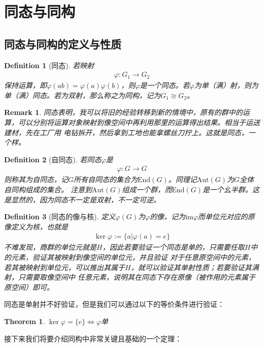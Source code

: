\documentclass[12pt,a4paper,UTF8]{ctexbook}
\theoremstyle{plain}
\newtheorem{theorem}{\indent Theorem}[section]
\newtheorem{definition}{\indent Definition}[section]
\newtheorem{remark}{\indent Remark}[section]
\begin{document}
\section{同态与同构}
\subsection{同态与同构的定义与性质}
\begin{definition}[同态]
    若映射
    \begin{align*} 
    \varphi:G_1\to G_2
    \end{align*}
    保持运算，即$\varphi(ab)=\varphi(a)\varphi(b)$，则$\varphi$是一个同态。若$\varphi$为单（满）射，则为单（满）同态。若为双射，那么称之为同构，记为$G_1 \cong G_2$。
\end{definition}
\begin{remark}
同态表明，我可以将旧的经验转移到新的情境中，原有的群中的运算，可以分别将运算对象映射到像空间中再利用那里的运算得出结果。相当于运送建材，先在工厂用
电钻拆开，然后拿到工地也能拿螺丝刀拧上。这就是同态，一个样。
\end{remark}
\begin{definition}[自同态]
    若同态$\varphi$是
    \begin{align*} 
    \varphi:G\to G
    \end{align*}
    则称其为自同态，记$G$所有自同态的集合为$\mathrm{End}(G)$。同理记$\mathrm{Aut}(G)$为$G$全体自同构组成的集合。
    注意到$\mathrm{Aut}(G)$组成一个群，而$\mathrm{End}(G)$是一个幺半群。这是显然的，因为同态不一定是双射，不一定可逆。
\end{definition}
\begin{definition}[同态的像与核]
    定义$\varphi(G)$为$\varphi$的像，记为$\mathrm{im} \varphi$而单位元对应的原像定义为核，也就是
    \begin{align*} 
    \ker \varphi := \{a|\varphi(a) = e\}
    \end{align*}
    不难发现，商群的单位元就是$H$，因此若要验证一个同态是单的，只需要任取$H$中的元素，验证其被映射到像空间的单位元，并且验证
    对于任意原空间中的元素，若其被映射到单位元，可以推出其属于$H$，就可以验证其单射性质；若要验证其满射，只需要取像空间中
    任意元素，说明其在同态下存在原像（被作用的元素属于原空间）即可。
\end{definition}
同态是单射并不好验证，但是我们可以通过以下的等价条件进行验证：
\begin{theorem}
$\ker \varphi = \{e\}\Leftrightarrow \varphi $单
\end{theorem}
接下来我们将要介绍同构中非常关键且基础的一个定理：
\end{document}
